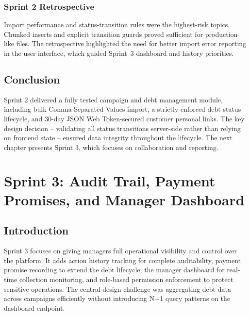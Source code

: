 \documentclass[12pt,a4paper]{report}
\begin{document}
\subsection{Sprint 2 Retrospective}

Import performance and status-transition rules were the highest-risk topics.
Chunked inserts and explicit transition guards proved sufficient for production-like files.
The retrospective highlighted the need for better import error reporting in the user interface,
which guided Sprint~3 dashboard and history priorities.

\section*{Conclusion}
{}

Sprint 2 delivered a fully tested campaign and debt management module, including bulk
Comma-Separated Values import, a strictly enforced debt status lifecycle, and 30-day JSON Web Token-secured
customer personal links.
The key design decision -- validating all status transitions server-side rather than
relying on frontend state -- ensured data integrity throughout the lifecycle.
The next chapter presents Sprint 3, which focuses on collaboration and reporting.

\clearpage
\chapter{Sprint 3: Audit Trail, Payment Promises, and Manager Dashboard}
\label{chap:sprint3}

\section*{Introduction}
{}

Sprint 3 focuses on giving managers full operational visibility and control over
the platform.
It adds action history tracking for complete auditability, payment promise recording
to extend the debt lifecycle, the manager dashboard for real-time collection
monitoring, and role-based permission enforcement to protect sensitive operations.
The central design challenge was aggregating debt data across campaigns efficiently
without introducing N+1 query patterns on the dashboard endpoint.
\end{document}
